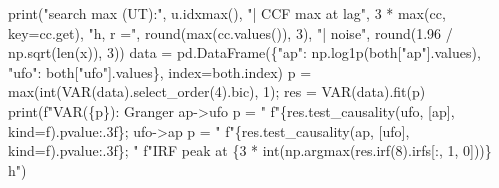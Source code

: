 \documentclass[
  10pt,
  a4paper,
]{article}
\newenvironment{Shaded}{}{}
\newcommand{\BuiltInTok}[1]{#1}
\newcommand{\DecValTok}[1]{#1}
\newcommand{\FloatTok}[1]{#1}
\newcommand{\NormalTok}[1]{#1}
\newcommand{\OperatorTok}[1]{#1}
\newcommand{\SpecialCharTok}[1]{#1}
\newcommand{\SpecialStringTok}[1]{#1}
\newcommand{\StringTok}[1]{#1}
\begin{document}
\begin{Shaded}
\begin{Highlighting}[]
\BuiltInTok{print}\NormalTok{(}\StringTok{"search max (UT):"}\NormalTok{, u.idxmax(), }\StringTok{"| CCF max at lag"}\NormalTok{, }\DecValTok{3} \OperatorTok{*} \BuiltInTok{max}\NormalTok{(cc, key}\OperatorTok{=}\NormalTok{cc.get),}
      \StringTok{"h, r ="}\NormalTok{, }\BuiltInTok{round}\NormalTok{(}\BuiltInTok{max}\NormalTok{(cc.values()), }\DecValTok{3}\NormalTok{), }\StringTok{"| noise"}\NormalTok{, }\BuiltInTok{round}\NormalTok{(}\FloatTok{1.96} \OperatorTok{/}\NormalTok{ np.sqrt(}\BuiltInTok{len}\NormalTok{(x)), }\DecValTok{3}\NormalTok{))}
\NormalTok{data }\OperatorTok{=}\NormalTok{ pd.DataFrame(\{}\StringTok{"ap"}\NormalTok{: np.log1p(both[}\StringTok{"ap"}\NormalTok{].values), }\StringTok{"ufo"}\NormalTok{: both[}\StringTok{"ufo"}\NormalTok{].values\},}
\NormalTok{                    index}\OperatorTok{=}\NormalTok{both.index)}
\NormalTok{p }\OperatorTok{=} \BuiltInTok{max}\NormalTok{(}\BuiltInTok{int}\NormalTok{(VAR(data).select\_order(}\DecValTok{4}\NormalTok{).bic), }\DecValTok{1}\NormalTok{)}\OperatorTok{;}\NormalTok{ res }\OperatorTok{=}\NormalTok{ VAR(data).fit(p)}
\BuiltInTok{print}\NormalTok{(}\SpecialStringTok{f"VAR(}\SpecialCharTok{\{}\NormalTok{p}\SpecialCharTok{\}}\SpecialStringTok{): Granger ap{-}\textgreater{}ufo p = "}
      \SpecialStringTok{f"}\SpecialCharTok{\{}\NormalTok{res}\SpecialCharTok{.}\NormalTok{test\_causality(}\StringTok{\textquotesingle{}ufo\textquotesingle{}}\NormalTok{, [}\StringTok{\textquotesingle{}ap\textquotesingle{}}\NormalTok{], kind}\OperatorTok{=}\StringTok{\textquotesingle{}f\textquotesingle{}}\NormalTok{)}\SpecialCharTok{.}\NormalTok{pvalue}\SpecialCharTok{:.3f\}}\SpecialStringTok{; ufo{-}\textgreater{}ap p = "}
      \SpecialStringTok{f"}\SpecialCharTok{\{}\NormalTok{res}\SpecialCharTok{.}\NormalTok{test\_causality(}\StringTok{\textquotesingle{}ap\textquotesingle{}}\NormalTok{, [}\StringTok{\textquotesingle{}ufo\textquotesingle{}}\NormalTok{], kind}\OperatorTok{=}\StringTok{\textquotesingle{}f\textquotesingle{}}\NormalTok{)}\SpecialCharTok{.}\NormalTok{pvalue}\SpecialCharTok{:.3f\}}\SpecialStringTok{; "}
      \SpecialStringTok{f"IRF peak at }\SpecialCharTok{\{}\DecValTok{3} \OperatorTok{*} \BuiltInTok{int}\NormalTok{(np.argmax(res.irf(}\DecValTok{8}\NormalTok{).irfs[:, }\DecValTok{1}\NormalTok{, }\DecValTok{0}\NormalTok{]))}\SpecialCharTok{\}}\SpecialStringTok{ h"}\NormalTok{)}


\end{Highlighting}
\end{Shaded}
\end{document}
